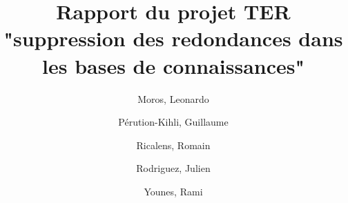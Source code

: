 \documentclass{article}
\title{Rapport du projet TER "suppression des redondances dans les bases de connaissances"}
\author{
  Moros, Leonardo\\
  \and
  Pérution-Kihli, Guillaume\\
  \and
  Ricalens, Romain\\
  \and
  Rodriguez, Julien\\
  \and
  Younes, Rami\\}
\begin{document}
\maketitle
\newpage
\renewcommand{\contentsname}{Sommaire}
\tableofcontents
\newpage


\newpage

\newpage

\newpage

\newpage

\newpage

\newpage

\newpage

\end{document}
